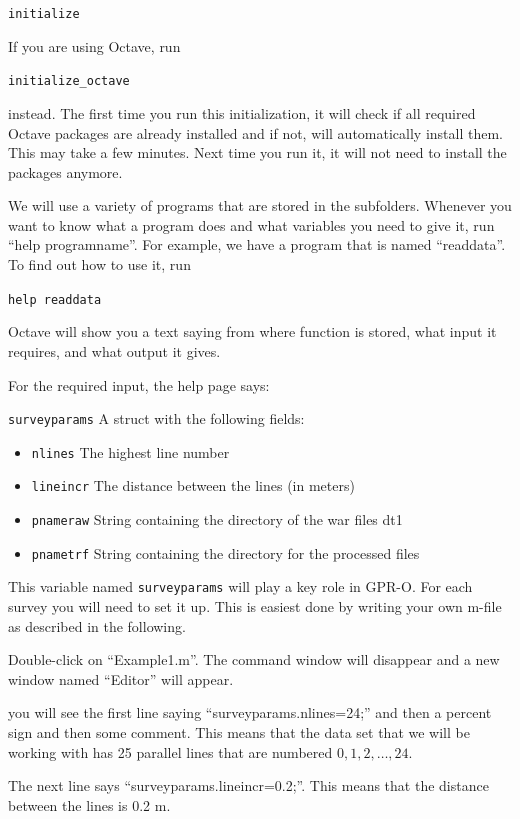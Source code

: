 \documentclass[11pt]{article}
\begin{document}
\qquad \verb#initialize#

If you are using Octave, run

\qquad \verb#initialize_octave#

instead. The first time you run this initialization, it will check if
all required Octave packages are already installed and if not, will
automatically install them. This may take a few minutes. Next time you
run it, it will not need to install the packages anymore.

We will use a variety of programs that are stored in the
subfolders. Whenever you want to know what a program does and what
variables you need to give it, run ``help programname''. For example,
we have a program that is named ``readdata''. To find out how to use
it, run

\qquad \verb#help readdata#

Octave will show you a text saying from where function is stored, what
input it requires, and what output it gives.

For the required input, the help page says:

\verb#surveyparams# A struct with the following fields:
\begin{itemize}
\item \verb#nlines# The highest line number
\item \verb"lineincr" The distance between the lines (in meters)
\item \verb#pnameraw# String containing the directory of the war files
  dt1
\item \verb#pnametrf# String containing the directory for the
  processed files
\end{itemize}
 
This variable named \verb#surveyparams# will play a key role in
GPR-O. For each survey you will need to set it up. This is easiest
done by writing your own m-file as described in the following.

Double-click on ``Example1.m''. The command window will disappear and
a new window named ``Editor'' will appear.

you will see the first line saying ``surveyparams.nlines=24;'' and
then a percent sign and then some comment.  This means that the data
set that we will be working with has 25 parallel lines that are
numbered $0, 1, 2, \ldots, 24$.

The next line says ``surveyparams.lineincr=0.2;''. This means that the
distance between the lines is 0.2 m.
\end{document}
